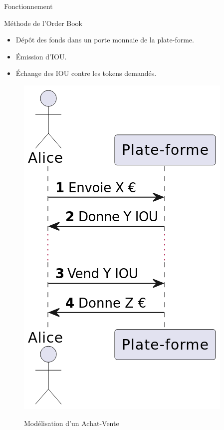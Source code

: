 \begin{frame}{Fonctionnement}    
    \begin{block}{Méthode de l'Order Book}
        \begin{itemize}
            \item Dépôt des fonds dans un porte monnaie de la plate-forme. 
            \item Émission d'IOU\footnotemark.
            \item Échange des IOU contre les tokens demandés.
        \end{itemize}
    \end{block}
    \begin{figure}
        \centering
        \includegraphics[scale = 0.25]{centralisation/img_plateformes/Achat-Vente.png}
        \label{fig:Order}
        \caption{Modélisation d'un Achat-Vente}
    \end{figure}
\end{frame}

